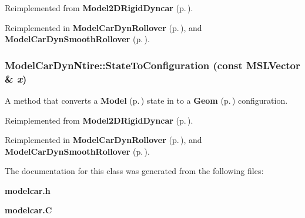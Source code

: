 Reimplemented from {\bf Model2DRigid\-Dyncar} {\rm (p.\,\pageref{classModel2DRigidDyncar_a5})}.

Reimplemented in {\bf Model\-Car\-Dyn\-Rollover} {\rm (p.\,\pageref{classModelCarDynRollover_a6})}, and {\bf Model\-Car\-Dyn\-Smooth\-Rollover} {\rm (p.\,\pageref{classModelCarDynSmoothRollover_a4})}.
\subsubsection{ Model\-Car\-Dyn\-Ntire::State\-To\-Configuration (const {\bf MSLVector} \& {\em x})\hspace{0.3cm}{\tt  [virtual]}}\label{classModelCarDynNtire_a2}


A method that converts a {\bf Model} {\rm (p.\,\pageref{classModel})} state in to a {\bf Geom} {\rm (p.\,\pageref{classGeom})} configuration.



Reimplemented from {\bf Model2DRigid\-Dyncar} {\rm (p.\,\pageref{classModel2DRigidDyncar_a3})}.

Reimplemented in {\bf Model\-Car\-Dyn\-Rollover} {\rm (p.\,\pageref{classModelCarDynRollover_a4})}, and {\bf Model\-Car\-Dyn\-Smooth\-Rollover} {\rm (p.\,\pageref{classModelCarDynSmoothRollover_a3})}.

The documentation for this class was generated from the following files:\begin{CompactItemize}
\item 
{\bf modelcar.h}\item 
{\bf modelcar.C}\end{CompactItemize}
